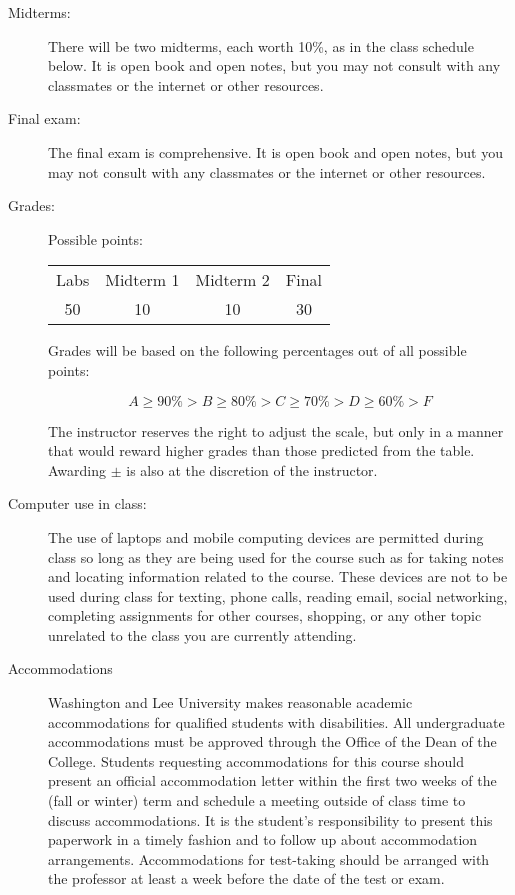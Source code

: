 \documentclass[12pt]{article}
\begin{document}
\begin{description}
\item[Midterms:]  There will be two midterms, each worth 10\%, as
in the class schedule below.   It is open
book and open notes, but you may not consult with any classmates
or the internet or other resources.


\item[Final exam:]  The final exam is comprehensive.  It is open
book and open notes, but you may not consult with any classmates
or the internet or other resources.


\item[Grades:]  Possible points:

\begin{center}
\begin{tabular}{cccc}
Labs & Midterm 1 & Midterm 2 & Final \\
50 & 10 & 10 & 30 \\
\end{tabular}
\end{center}

Grades will be based on the following percentages
out of all possible points:

\[
A \geq 90\% > B \geq 80\% > C \geq 70\% > D \geq 60\% > F
\]

The instructor reserves the right to adjust the scale,
but only in a manner that would reward higher grades than
those predicted from the table. Awarding $\pm$ is also at
the discretion of the instructor.


\item[Computer use in class:]
The use of laptops and mobile computing devices are 
permitted during class so long as they are being used 
for the course such as for taking notes and locating
information related to the course. These devices are
not to be used during class for texting, phone calls, 
reading email, social networking, completing assignments
for other courses, shopping, or any other topic unrelated
to the class you are currently attending.

\item[Accommodations]
Washington and Lee University makes reasonable academic 
accommodations for qualified students with disabilities. 
All undergraduate accommodations must be approved through 
the Office of the Dean of the College. Students requesting 
accommodations for this course should present an official 
accommodation letter within the first two weeks of the 
(fall or winter) term and schedule a meeting outside of 
class time to discuss accommodations. It is the student’s 
responsibility to present this paperwork in a timely 
fashion and to follow up about accommodation arrangements. 
Accommodations for test-taking should be arranged with the 
professor at least a week before the date of the test or exam.


\end{description}
\end{document}
